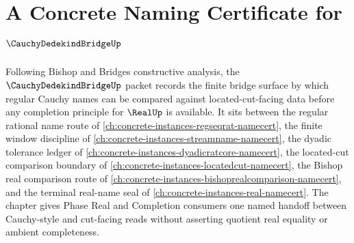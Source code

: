 \chapter{A Concrete Naming Certificate for $\CauchyDedekindBridgeUp$}
\label{ch:concrete-instances-cauchy-dedekind-bridge-namecert}

Following Bishop and Bridges constructive analysis, the $\CauchyDedekindBridgeUp$ packet records the finite bridge surface by which regular Cauchy names can be compared against located-cut-facing data before any completion principle for $\RealUp$ is available. It sits between the regular rational name route of \autoref{ch:concrete-instances-regseqrat-namecert}, the finite window discipline of \autoref{ch:concrete-instances-streamname-namecert}, the dyadic tolerance ledger of \autoref{ch:concrete-instances-dyadicratcore-namecert}, the located-cut comparison boundary of \autoref{ch:concrete-instances-locatedcut-namecert}, the Bishop real comparison route of \autoref{ch:concrete-instances-bishoprealcomparison-namecert}, and the terminal real-name seal of \autoref{ch:concrete-instances-real-namecert}. The chapter gives Phase Real and Completion consumers one named handoff between Cauchy-style and cut-facing reads without asserting quotient real equality or ambient completeness.

